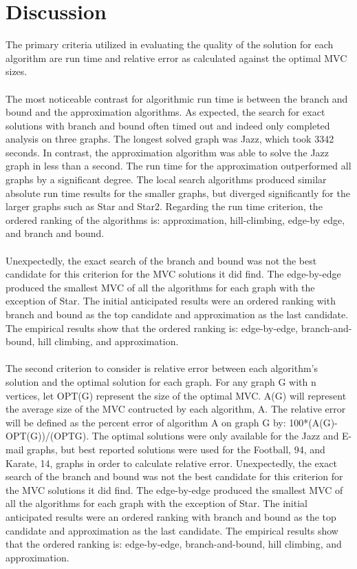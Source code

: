 \documentclass{sig-alternate-05-2015}
\begin{document}
\section{Discussion}
The primary criteria utilized in evaluating the quality of the solution for each algorithm are run time and relative error as calculated against the optimal MVC sizes.
\\
\\
	The most noticeable contrast for algorithmic run time is between the branch and bound and the approximation algorithms. As expected, the search for exact solutions with branch and bound often timed out and indeed only completed analysis on three graphs. The longest solved graph was Jazz, which took 3342 seconds. In contrast, the approximation algorithm was able to solve the Jazz graph in less than a second. The run time for the approximation outperformed all graphs by a significant degree. The local search algorithms produced similar absolute run time results for the smaller graphs, but diverged significantly for the larger graphs such as Star and Star2. Regarding the run time criterion, the ordered ranking of the algorithms is: approximation, hill-climbing, edge-by edge, and branch and bound.
\\
\\
	Unexpectedly, the exact search of the branch and bound was not the best candidate for this criterion for the MVC solutions it did find. The edge-by-edge produced the smallest MVC of all the algorithms for each graph with the exception of Star. The initial anticipated results were an ordered ranking with branch and bound as the top candidate and approximation as the last candidate. The empirical results show that the ordered ranking is: edge-by-edge, branch-and-bound, hill climbing, and approximation.
\\
\\
	The second criterion to consider is relative error between each algorithm’s solution and the optimal solution for each graph. For any graph G with n vertices, let OPT(G) represent the size of the optimal MVC.  A(G) will represent the average size of the MVC contructed by each algorithm, A. The relative error will be defined as the percent error of algorithm A on graph G by: 100*(A(G)-OPT(G))/(OPTG). The optimal solutions were only available for the Jazz and E-mail graphs, but best reported solutions were used for the Football, 94, and Karate, 14, graphs in order to calculate relative error. Unexpectedly, the exact search of the branch and bound was not the best candidate for this criterion for the MVC solutions it did find. The edge-by-edge produced the smallest MVC of all the algorithms for each graph with the exception of Star. The initial anticipated results were an ordered ranking with branch and bound as the top candidate and approximation as the last candidate. The empirical results show that the ordered ranking is: edge-by-edge, branch-and-bound, hill climbing, and approximation.
\end{document}
